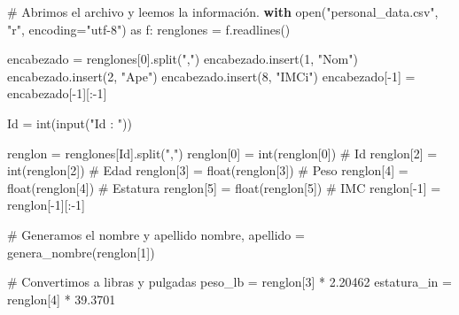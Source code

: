 \documentclass[
  spanish,
  letterpaper,
]{scrbook}
\newenvironment{Shaded}{\begin{snugshade}}{\end{snugshade}}
\newcommand{\BuiltInTok}[1]{\textcolor[rgb]{0.00,0.23,0.31}{#1}}
\newcommand{\CommentTok}[1]{\textcolor[rgb]{0.37,0.37,0.37}{#1}}
\newcommand{\ControlFlowTok}[1]{\textcolor[rgb]{0.00,0.23,0.31}{\textbf{#1}}}
\newcommand{\DecValTok}[1]{\textcolor[rgb]{0.68,0.00,0.00}{#1}}
\newcommand{\FloatTok}[1]{\textcolor[rgb]{0.68,0.00,0.00}{#1}}
\newcommand{\ImportTok}[1]{\textcolor[rgb]{0.00,0.46,0.62}{#1}}
\newcommand{\NormalTok}[1]{\textcolor[rgb]{0.00,0.23,0.31}{#1}}
\newcommand{\OperatorTok}[1]{\textcolor[rgb]{0.37,0.37,0.37}{#1}}
\newcommand{\StringTok}[1]{\textcolor[rgb]{0.13,0.47,0.30}{#1}}
\theoremstyle{definition}
\theoremstyle{remark}
\begin{document}
\begin{Shaded}
\begin{Highlighting}[]
\CommentTok{\# Abrimos el archivo y leemos la información.}
\ControlFlowTok{with} \BuiltInTok{open}\NormalTok{(}\StringTok{"personal\_data.csv"}\NormalTok{, }\StringTok{"r"}\NormalTok{, encoding}\OperatorTok{=}\StringTok{"utf{-}8"}\NormalTok{) }\ImportTok{as}\NormalTok{ f:}
\NormalTok{    renglones }\OperatorTok{=}\NormalTok{ f.readlines()}

\NormalTok{encabezado }\OperatorTok{=}\NormalTok{ renglones[}\DecValTok{0}\NormalTok{].split(}\StringTok{","}\NormalTok{)}
\NormalTok{encabezado.insert(}\DecValTok{1}\NormalTok{, }\StringTok{"Nom"}\NormalTok{)}
\NormalTok{encabezado.insert(}\DecValTok{2}\NormalTok{, }\StringTok{"Ape"}\NormalTok{)}
\NormalTok{encabezado.insert(}\DecValTok{8}\NormalTok{, }\StringTok{"IMCi"}\NormalTok{)}
\NormalTok{encabezado[}\OperatorTok{{-}}\DecValTok{1}\NormalTok{] }\OperatorTok{=}\NormalTok{ encabezado[}\OperatorTok{{-}}\DecValTok{1}\NormalTok{][:}\OperatorTok{{-}}\DecValTok{1}\NormalTok{]}

\NormalTok{Id }\OperatorTok{=} \BuiltInTok{int}\NormalTok{(}\BuiltInTok{input}\NormalTok{(}\StringTok{"Id : "}\NormalTok{))}

\NormalTok{renglon }\OperatorTok{=}\NormalTok{ renglones[Id].split(}\StringTok{","}\NormalTok{)}
\NormalTok{renglon[}\DecValTok{0}\NormalTok{] }\OperatorTok{=} \BuiltInTok{int}\NormalTok{(renglon[}\DecValTok{0}\NormalTok{])   }\CommentTok{\# Id}
\NormalTok{renglon[}\DecValTok{2}\NormalTok{] }\OperatorTok{=} \BuiltInTok{int}\NormalTok{(renglon[}\DecValTok{2}\NormalTok{])   }\CommentTok{\# Edad}
\NormalTok{renglon[}\DecValTok{3}\NormalTok{] }\OperatorTok{=} \BuiltInTok{float}\NormalTok{(renglon[}\DecValTok{3}\NormalTok{]) }\CommentTok{\# Peso}
\NormalTok{renglon[}\DecValTok{4}\NormalTok{] }\OperatorTok{=} \BuiltInTok{float}\NormalTok{(renglon[}\DecValTok{4}\NormalTok{]) }\CommentTok{\# Estatura}
\NormalTok{renglon[}\DecValTok{5}\NormalTok{] }\OperatorTok{=} \BuiltInTok{float}\NormalTok{(renglon[}\DecValTok{5}\NormalTok{]) }\CommentTok{\# IMC}
\NormalTok{renglon[}\OperatorTok{{-}}\DecValTok{1}\NormalTok{] }\OperatorTok{=}\NormalTok{ renglon[}\OperatorTok{{-}}\DecValTok{1}\NormalTok{][:}\OperatorTok{{-}}\DecValTok{1}\NormalTok{]}

\CommentTok{\# Generamos el nombre y apellido}
\NormalTok{nombre, apellido }\OperatorTok{=}\NormalTok{ genera\_nombre(renglon[}\DecValTok{1}\NormalTok{])}

\CommentTok{\# Convertimos a libras y pulgadas}
\NormalTok{peso\_lb }\OperatorTok{=}\NormalTok{ renglon[}\DecValTok{3}\NormalTok{] }\OperatorTok{*} \FloatTok{2.20462}
\NormalTok{estatura\_in }\OperatorTok{=}\NormalTok{ renglon[}\DecValTok{4}\NormalTok{] }\OperatorTok{*} \FloatTok{39.3701}


\end{Highlighting}
\end{Shaded}
\end{document}
